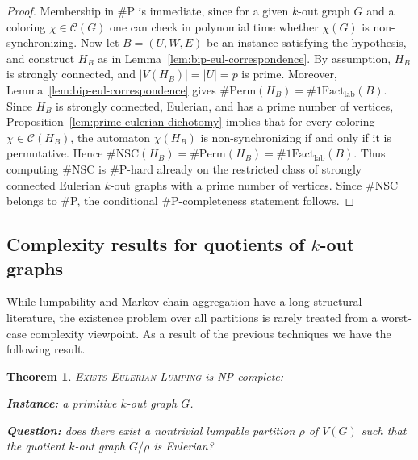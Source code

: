 \documentclass[a4paper,10pt]{amsart}
\theoremstyle{plain}
\newtheorem{theorem}{Theorem}[section]
\theoremstyle{definition}
\begin{document}
\begin{proof}
Membership in \#P is immediate, since for a given $k$-out graph $G$ and a coloring $\chi\in\mathcal C(G)$ one can check in polynomial time whether $\chi(G)$ is non-synchronizing. Now let $B=(U,W,E)$ be an instance satisfying the hypothesis, and construct $H_B$ as in Lemma~\ref{lem:bip-eul-correspondence}. By assumption, $H_B$ is strongly connected, and $|V(H_B)|=|U|=p$ is prime. Moreover, Lemma~\ref{lem:bip-eul-correspondence} gives $\#\mathrm{Perm}(H_B)=\#1\mathrm{Fact}_{\mathrm{lab}}(B)$. Since $H_B$ is strongly connected, Eulerian, and has a prime number of vertices, Proposition~\ref{lem:prime-eulerian-dichotomy} implies that for every coloring $\chi\in\mathcal C(H_B)$, the automaton $\chi(H_B)$ is non-synchronizing if and only if it is permutative. Hence $\#\mathrm{NSC}(H_B)=\#\mathrm{Perm}(H_B)=\#1\mathrm{Fact}_{\mathrm{lab}}(B)$. Thus computing $\#\mathrm{NSC}$ is \#P-hard already on the restricted class of strongly connected Eulerian $k$-out graphs with a prime number of vertices.
Since $\#\mathrm{NSC}$ belongs to \#P, the conditional \#P-completeness statement follows.
\end{proof}



\subsection{Complexity results for quotients of $k$-out graphs}
While lumpability and Markov chain aggregation have a long structural literature, the existence problem over all partitions is rarely treated from a worst-case complexity viewpoint. As a result of the previous techniques we have the following result. 
\begin{theorem}\label{thm:eulerian-lumping-npcomplete}\textsc{Exists-Eulerian-Lumping} is NP-complete:

\textbf{Instance:} a primitive $k$-out graph $G$.

\textbf{Question:} does there exist a nontrivial lumpable partition $\rho$ of $V(G)$ such that the quotient $k$-out graph
$G/\rho$ is Eulerian? 
\end{theorem}
\end{document}
